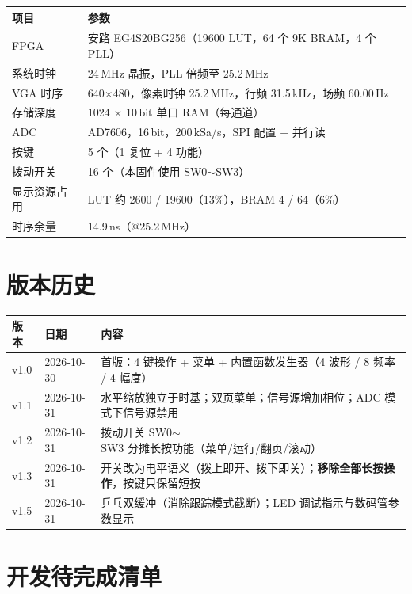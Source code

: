 \documentclass[UTF8,a4paper,11pt]{ctexart}
\begin{document}
\begin{center}
\small
\begin{tabular}{ll}
\toprule
项目 & 参数\\
\midrule
FPGA & 安路 EG4S20BG256（19600 LUT，64 个 9K BRAM，4 个 PLL）\\
系统时钟 & 24\,MHz 晶振，PLL 倍频至 25.2\,MHz\\
VGA 时序 & 640$\times$480，像素时钟 25.2\,MHz，行频 31.5\,kHz，场频 60.00\,Hz\\
存储深度 & 1024 $\times$ 10\,bit 单口 RAM（每通道）\\
ADC & AD7606，16\,bit，200\,kSa/s，SPI 配置 + 并行读\\
按键 & 5 个（1 复位 + 4 功能）\\
拨动开关 & 16 个（本固件使用 SW0$\sim$SW3）\\
显示资源占用 & LUT 约 2600 / 19600（13\%），BRAM 4 / 64（6\%）\\
时序余量 & 14.9\,ns（$@$25.2\,MHz）\\
\bottomrule
\end{tabular}
\end{center}

\section{版本历史}

\begin{center}
\small
\begin{tabular}{llp{8.4cm}}
\toprule
版本 & 日期 & 内容\\
\midrule
v1.0 & 2026-10-30 & 首版：4 键操作 + 菜单 + 内置函数发生器（4 波形 / 8 频率 / 4 幅度）\\
v1.1 & 2026-10-31 & 水平缩放独立于时基；双页菜单；信号源增加相位；ADC 模式下信号源禁用\\
v1.2 & 2026-10-31 & 拨动开关 SW0$\sim$SW3 分摊长按功能（菜单/运行/翻页/滚动）\\
v1.3 & 2026-10-31 & 开关改为电平语义（拨上即开、拨下即关）；\textbf{移除全部长按操作}，按键只保留短按\\
v1.5 & 2026-10-31 & 乒乓双缓冲（消除跟踪模式截断）；LED 调试指示与数码管参数显示\\
\bottomrule
\end{tabular}
\end{center}

\section{开发待完成清单}
\label{sec:todo}
\end{document}
